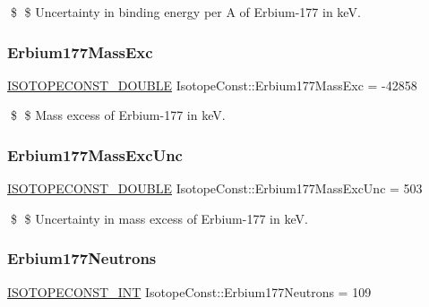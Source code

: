 \$ \$ Uncertainty in binding energy per A of Erbium-\/177 in keV. \mbox{\label{group___isotope_const-_erbium-_er177_ga36d38e264f9d42529e1320ca438838f5}} 
\subsubsection{\texorpdfstring{Erbium177\+Mass\+Exc}{Erbium177MassExc}}
{\footnotesize\ttfamily \mbox{\hyperlink{group___isotope_const-_macros_ga8f45a7272ce02c0b4c65c44636ed719a}{I\+S\+O\+T\+O\+P\+E\+C\+O\+N\+S\+T\+\_\+\+D\+O\+U\+B\+LE}} Isotope\+Const\+::\+Erbium177\+Mass\+Exc = -\/42858}

\$ \$ Mass excess of Erbium-\/177 in keV. \mbox{\label{group___isotope_const-_erbium-_er177_gae920838d21264c39d6f92ec2ce8546b7}} 
\subsubsection{\texorpdfstring{Erbium177\+Mass\+Exc\+Unc}{Erbium177MassExcUnc}}
{\footnotesize\ttfamily \mbox{\hyperlink{group___isotope_const-_macros_ga8f45a7272ce02c0b4c65c44636ed719a}{I\+S\+O\+T\+O\+P\+E\+C\+O\+N\+S\+T\+\_\+\+D\+O\+U\+B\+LE}} Isotope\+Const\+::\+Erbium177\+Mass\+Exc\+Unc = 503}

\$ \$ Uncertainty in mass excess of Erbium-\/177 in keV. \mbox{\label{group___isotope_const-_erbium-_er177_gac9e825fd21dbd730bdd1b11b5cf5d046}} 
\subsubsection{\texorpdfstring{Erbium177\+Neutrons}{Erbium177Neutrons}}
{\footnotesize\ttfamily \mbox{\hyperlink{group___isotope_const-_macros_ga5f18360b3e99483a35c32d789e62621c}{I\+S\+O\+T\+O\+P\+E\+C\+O\+N\+S\+T\+\_\+\+I\+NT}} Isotope\+Const\+::\+Erbium177\+Neutrons = 109}

